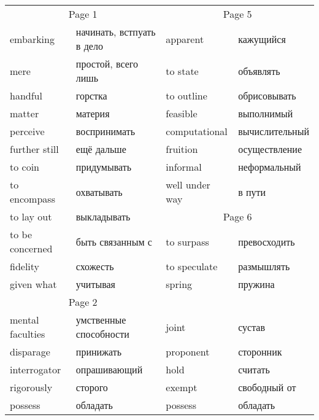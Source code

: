 \documentclass[12pt]{article}
\begin{document}
\begin{tabular}{| l l | l l | }
  \hline
  \multicolumn{2}{c|}{Page 1} & \multicolumn{2}{c|}{Page 5} \\
  embarking & начинать, встпуать в дело & apparent & кажущийся\\
  mere & простой, всего лишь & to state & объявлять \\
  handful & горстка & to outline & обрисовывать \\
  matter & материя & feasible & выполнимый \\
  perceive & воспринимать & computational & вычислительный \\
  further still & ещё дальше & fruition & осуществление \\
  to coin & придумывать & informal & неформальный \\
  to encompass & охватывать & well under way & в пути \\ \cline{3-4}
  to lay out & выкладывать & \multicolumn{2}{c|}{Page 6} \\
  to be concerned & быть связанным с & to surpass & превосходить \\
  fidelity & схожесть & to speculate & размышлять \\
  given what & учитывая & spring & пружина \\ \cline{1-2}

  \multicolumn{2}{c|}{Page 2} \\
  mental faculties & умственные способности & joint & сустав \\
  disparage & принижать & proponent & сторонник \\
  interrogator & опрашивающий & hold & считать \\
  rigorously & сторого & exempt & свободный от \\
  possess & обладать & possess & обладать \\ \cline{1-2}


\end{tabular}
\end{document}
